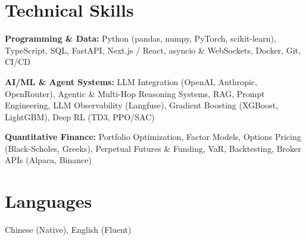\documentclass[11pt,a4paper]{article}
\begin{document}
\section{Technical Skills}

\textbf{Programming \& Data:} Python (pandas, numpy, PyTorch, scikit-learn), TypeScript, SQL, FastAPI, Next.js / React, asyncio \& WebSockets, Docker, Git, CI/CD

\textbf{AI/ML \& Agent Systems:} LLM Integration (OpenAI, Anthropic, OpenRouter), Agentic \& Multi-Hop Reasoning Systems, RAG, Prompt Engineering, LLM Observability (Langfuse), Gradient Boosting (XGBoost, LightGBM), Deep RL (TD3, PPO/SAC)

\textbf{Quantitative Finance:} Portfolio Optimization, Factor Models, Options Pricing (Black-Scholes, Greeks), Perpetual Futures \& Funding, VaR, Backtesting, Broker APIs (Alpaca, Binance)

\section{Languages}
Chinese (Native), English (Fluent)
\end{document}

